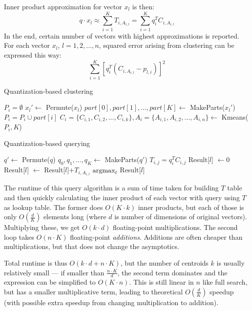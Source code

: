 Inner product approximation for vector $x_l$ is then:
$$q \cdot x_l \approx \sum_{i=1}^{K} T_{i,A_{i,l}} = \sum_{i=1}^{K} q_i^T C_{i,A_{i,l}}$$
In the end, certain number of vectors with highest approximations is reported.
For each vector $x_l$, $l = 1,2,...,n$, squared error arising from clustering can be expressed this way:
$$ \sum_{i=1}^{K}  [q_{i}^{T} (C_{i, A_{i,l}} - p_{l,i})]^2$$

\begin{algorithm}
	\caption{Quantization-based clustering}
	\begin{algorithmic}
			\State $P_i = \emptyset$
		\EndFor
			\State $x_l' \gets$ Permute($x_l$)
			\State $part[0], part[1], \dots, part[K] \gets$ MakeParts($x_l'$)
				\State $P_i = P_i \cup part[i]$
			\EndFor
		\EndFor
			\State $C_i = \{C_{i,1}, C_{i,2}, \dots, C_{i,k}\}, A_i = \{A_{i,1}, A_{i,2}, \dots, A_{i,n}\} \gets$ Kmeans($P_i, K$)
		\EndFor
	\end{algorithmic}
\end{algorithm}

\begin{algorithm}
	\caption{Quantization-based querying}
	\begin{algorithmic}
		\State $q' \gets$ Permute($q$)
		\State $q_0, q_1, \dots, q_K \gets$ MakeParts($q'$)
		\For{$i = 0, 1, \dots, K$}
			\For{$j = 0, 1, \dots, k$}
				\State $T_{i,j} = q_i^T C_{i,j}$
			\EndFor
		\EndFor
		\For{$l = 0, 1, \dots, n$}
			\State Result[$l$] $\gets 0$
			\For{$i = 0, 1, \dots, K$}
				\State Result[$l$] $\gets$ Result[$l$]$+ T_{i,A_{i,l}}$
			\EndFor
		\EndFor
		\State \Return $\operatorname*{argmax}_{l}$ Result[$l$]
	\end{algorithmic}
\end{algorithm}

The runtime of this query algorithm is a sum of time taken for building $T$ table and then
quickly calculating the inner product of each vector with query using $T$ as lookup table.
The former does $O(K \cdot k)$ inner products, but each of those is only $O(\frac{d}{K})$
elements long (where $d$ is number of dimensions of original vectors). 
Multiplying these, we get $O(k \cdot d)$ floating-point multiplications.
The second loop takes $O(n \cdot K)$ floating-point \textit{additions}. Additions are often
cheaper than multiplications, but that does not change the asymptotics.

Total runtime is thus $O(k \cdot d + n \cdot K)$, but the number of centroids $k$ is usually 
relatively small --- if smaller than $\frac{n \cdot K}{d}$, the second term dominates 
and the expression can be simplified to
$O(K \cdot n)$. This is still linear in $n$ like full search, but has a smaller multiplicative
term, leading to theoretical $O(\frac{d}{K})$ speedup (with possible extra speedup from changing
multiplication to addition).

